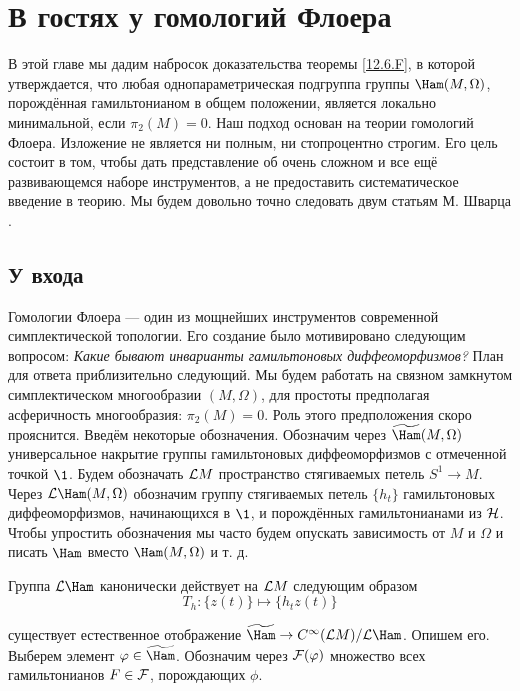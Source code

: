 \chapter[Гомологии Флоера]{В гостях у гомологий Флоера}\label{13}

В этой главе мы дадим набросок доказательства теоремы
\ref{12.6.F}, в которой утверждается, что любая однопараметрическая
подгруппа группы $\Ham(M, \Omega)$, порождённая гамильтонианом в общем
положении, является локально минимальной, если $π_{2}(M) = 0$.
Наш подход основан на теории гомологий Флоера.
Изложение не является
ни полным, ни стопроцентно строгим.
Его цель состоит в том, чтобы дать представление об очень сложном и
все ещё развивающемся наборе инструментов, а не
предоставить систематическое введение в теорию.
Мы будем довольно точно следовать двум статьям М. Шварца \cite{Sch2,
  Sch3}.

\section{У входа}\label{13.1}

Гомологии Флоера — один из мощнейших инструментов современной
симплектической топологии. 
Его создание было мотивировано следующим вопросом:
\textit{Какие бывают инварианты гамильтоновых диффеоморфизмов?}
План для ответа приблизительно следующий.
Мы будем работать на связном замкнутом симплектическом многообразии
$(M,\Omega)$, для простоты предполагая асферичность многообразия:
$π_{2}(M) = 0$.
Роль этого предположения скоро прояснится.
Введём некоторые обозначения.
Обозначим через $\widetilde\Ham(M,\Omega)$ универсальное накрытие
группы гамильтоновых диффеоморфизмов с отмеченной точкой $\1$.
Будем обозначать $\mathcal{L} M$ пространство стягиваемых петель $S^{1}\to
M$.
Через $\L\Ham(M,\Omega)$ обозначим группу стягиваемых петель
$\{h_{t}\}$ гамильтоновых 
диффеоморфизмов, 
начинающихся в $\1$,
и порождённых гамильтонианами из $\mathcal{H}$.
Чтобы упростить обозначения мы часто будем опускать зависимость от $M$
и $\Omega$ и писать $\Ham$ вместо $\Ham(M, \Omega)$ и т. д. 

Группа $\L\Ham$ канонически действует на $\mathcal{L} M$
следующим образом
\[
T_{h}: \{z(t)\}\mapsto \{h_{t}z(t)\}
\]

  
 существует естественное
отображение $\widetilde\Ham\z\to C^{\infty}(\L M)/\L\Ham$.
Опишем его.
Выберем элемент $\phi\in\widetilde\Ham$.
Обозначим
через $\mathcal{F}(\varphi)$ множество всех гамильтонианов $F\in\mathcal{F}$,
порождающих $\phi$.

